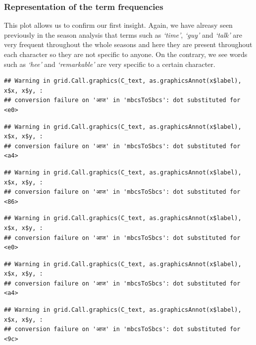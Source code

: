\documentclass[
]{article}
\begin{document}
\hypertarget{representation-of-the-term-frequencies-1}{%
\subsubsection{Representation of the term
frequencies}\label{representation-of-the-term-frequencies-1}}

This plot allows us to confirm our first insight. Again, we have alreasy
seen previously in the season analysis that terms such as \emph{`time'},
\emph{`guy'} and \emph{`talk'} are very frequent throughout the whole
seasons and here they are present throughout each character so they are
not specific to anyone. On the contrary, we see words such as
\emph{`hee'} and \emph{`remarkable'} are very specific to a certain
character.

\begin{verbatim}
## Warning in grid.Call.graphics(C_text, as.graphicsAnnot(x$label), x$x, x$y, :
## conversion failure on 'आज' in 'mbcsToSbcs': dot substituted for <e0>
\end{verbatim}

\begin{verbatim}
## Warning in grid.Call.graphics(C_text, as.graphicsAnnot(x$label), x$x, x$y, :
## conversion failure on 'आज' in 'mbcsToSbcs': dot substituted for <a4>
\end{verbatim}

\begin{verbatim}
## Warning in grid.Call.graphics(C_text, as.graphicsAnnot(x$label), x$x, x$y, :
## conversion failure on 'आज' in 'mbcsToSbcs': dot substituted for <86>
\end{verbatim}

\begin{verbatim}
## Warning in grid.Call.graphics(C_text, as.graphicsAnnot(x$label), x$x, x$y, :
## conversion failure on 'आज' in 'mbcsToSbcs': dot substituted for <e0>
\end{verbatim}

\begin{verbatim}
## Warning in grid.Call.graphics(C_text, as.graphicsAnnot(x$label), x$x, x$y, :
## conversion failure on 'आज' in 'mbcsToSbcs': dot substituted for <a4>
\end{verbatim}

\begin{verbatim}
## Warning in grid.Call.graphics(C_text, as.graphicsAnnot(x$label), x$x, x$y, :
## conversion failure on 'आज' in 'mbcsToSbcs': dot substituted for <9c>
\end{verbatim}
\end{document}

